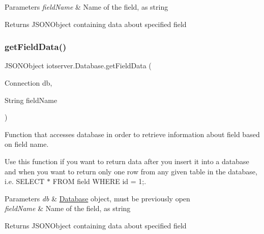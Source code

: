 \begin{DoxyParams}{Parameters}
{\em field\+Name} & Name of the field, as string \\
\hline
\end{DoxyParams}
\begin{DoxyReturn}{Returns}
J\+S\+O\+N\+Object containing data about specified field 
\end{DoxyReturn}
\mbox{\label{classiotserver_1_1Database_ac968e2f70df507390dcd535660801c5e}} 
\subsubsection{\texorpdfstring{get\+Field\+Data()}{getFieldData()}\hspace{0.1cm}{\footnotesize\ttfamily [2/3]}}
{\footnotesize\ttfamily J\+S\+O\+N\+Object iotserver.\+Database.\+get\+Field\+Data (\begin{DoxyParamCaption}\item[{Connection}]{db,  }\item[{String}]{field\+Name }\end{DoxyParamCaption})\hspace{0.3cm}{\ttfamily [inline]}}

Function that accesses database in order to retrieve information about field based on field name.

Use this function if you want to return data after you insert it into a database and when you want to return only one row from any given table in the database, i.\+e. S\+E\+L\+E\+CT $\ast$ F\+R\+OM field W\+H\+E\+RE id = 1;.


\begin{DoxyParams}{Parameters}
{\em db} & \hyperlink{classiotserver_1_1Database}{Database} object, must be previously open \\
\hline
{\em field\+Name} & Name of the field, as string \\
\hline
\end{DoxyParams}
\begin{DoxyReturn}{Returns}
J\+S\+O\+N\+Object containing data about specified field 
\end{DoxyReturn}
\mbox{\label{classiotserver_1_1Database_ab92010b913a502847e7a062d2aa9ad72}} 
